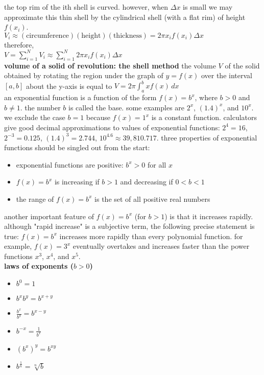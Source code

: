 \documentclass{article}
\begin{document}
the top rim of the ith shell is curved. however, when $\Delta x$ is small we may approximate this thin shell by the cylindrical shell (with a flat rim) of height $f(x_i)$.\\ $V_i \approx (\text{circumference})(\text{height})(\text{thickness}) = 2\pi x_if(x_i)\Delta x$\\ therefore,\\ $V = \sum_{i=1}^{N}V_i \approx \sum_{i=1}^{N}2\pi x_if(x_i)\Delta x$\\

\textbf{volume of a solid of revolution: the shell method} the volume $V$ of the solid obtained by rotating the region under the graph of $y = f(x)$ over the interval $[a, b]$ about the y-axis is equal to $V = 2\pi \int_{a}^{b}xf(x)\,dx$\\

\newpage
an exponential function is a function of the form $f(x) = b^x$, where $b > 0$ and $b \neq 1$. the number $b$ is called the base. some examples are $2^x$, $(1.4)^x$, and $10^x$. we exclude the case $b = 1$ because $f(x) = 1^x$ is a constant function. calculators give good decimal approximations to values of exponential functions: $2^4 = 16$, $2^{-3} = 0.125$, $(1.4)^3 = 2.744$, $10^{4.6} \approx 39,810.717$. three properties of exponential functions should be singled out from the start:
	\begin{itemize}
		\item exponential functions are positive: $b^x > 0$ for all $x$
		\item $f(x) = b^x$ is increasing if $b > 1$ and decreasing if $0 < b < 1$
		\item the range of $f(x) = b^x$ is the set of all positive real numbers
	\end{itemize}
another important feature of $f(x) = b^x$ (for $b > 1$) is that it increases rapidly. although "rapid increase" is a subjective term, the following precise statement is true: $f(x) = b^x$ increases more rapidly than every polynomial function. for example, $f(x) = 3^x$ eventually overtakes and increases faster than the power functions $x^3$, $x^4$, and $x^5$.\\

\textbf{laws of exponents ($b > 0$)}
	\begin{itemize}
		\item $b^0 = 1$
		\item $b^xb^y = b^{x + y}$
		\item $\frac{b^x}{b^y} = b^{x - y}$
		\item $b^{-x} = \frac{1}{b^x}$
		\item $(b^x)^y = b^{xy}$
		\item $b^{\frac{1}{n}} = \sqrt[n]{b}$
	\end{itemize}
\end{document}
